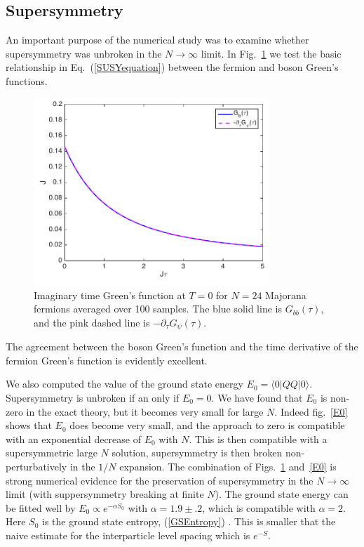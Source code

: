 \documentclass[aps,pre,preprint,onecolumn,citeautoscript,superscriptaddress,nofootinbib,eqsecnum]{revtex4-1}
\def\nref#1{(\ref{#1})}
\begin{document}
\subsection{Supersymmetry}

An important purpose of the numerical study was to examine whether supersymmetry was unbroken in the $N \rightarrow \infty$
limit. In Fig.~\ref{fig:dGpsi} we test the basic relationship in Eq.~(\ref{SUSYequation}) between the fermion and boson Green's functions.
\begin{figure}[h]
\center
\includegraphics[width=3.5in]{GbDGpsi.pdf}
\caption{Imaginary time Green's function at $T=0$ for $N=24$ Majorana fermions averaged over 100 samples. The blue solid line is $G_{bb}(\tau)$, and the pink dashed line is $-\partial_{\tau}G_{\psi}(\tau)$. }
\label{fig:dGpsi}
\end{figure}
The agreement between the boson Green's function and the time derivative of the fermion Green's function is evidently excellent.
 
We also computed  the value of the ground state energy $E_0=\langle 0|QQ|0\rangle$. Supersymmetry is unbroken if an only if $E_0 =0$. 
We have found that $E_0$ is non-zero in the exact theory, but it becomes very small  for large  $N$. Indeed 
 fig.~\ref{E0} shows that $E_0$ does become very small,
and the approach to zero is compatible with an exponential decrease of $E_0$ with $N$.
 This is then compatible with a supersymmetric large $N$ solution, supersymmetry is then broken non-perturbatively in the $1/N$ expansion. 
 The combination of Figs.~\ref{fig:dGpsi} and~\ref{E0} is strong numerical evidence for the preservation of supersymmetry 
in the $N \rightarrow \infty$ limit (with suppersymmetry breaking at finite $N$). The ground state energy can be fitted well by $ E_0 \propto e^{ - \alpha S_0 } $
with $\alpha = 1.9 \pm .2 $, which is compatible with $\alpha =2$. Here $S_0 $ is the ground state entropy, \nref{GSEntropy} . 
This is smaller that the naive estimate for the interparticle level spacing which is $e^{ - S } $. 
\end{document}
